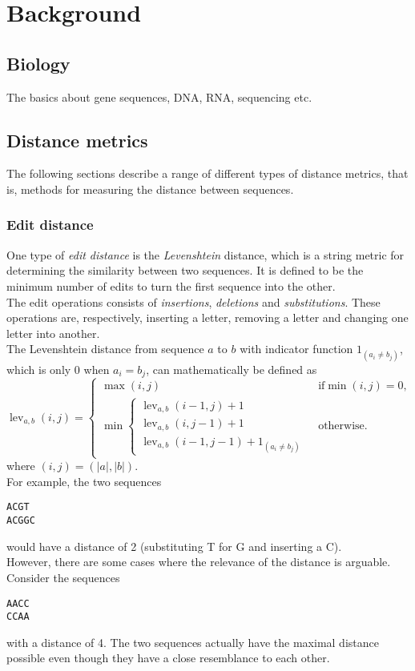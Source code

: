 \section{Background}

\subsection{Biology}
The basics about gene sequences, DNA, RNA, sequencing etc. %

\subsection{Distance metrics}
The following sections describe a range of different types of distance metrics,
that is, methods for measuring the distance between sequences.

\subsubsection{Edit distance}
One type of \emph{edit distance} is the \emph{Levenshtein} distance, which is a
string metric for determining the similarity between two sequences. It is
defined to be the minimum number of edits to turn the first sequence into the
other. \\
The edit operations consists of \emph{insertions}, \emph{deletions} and
\emph{substitutions}. These operations are, respectively, inserting a letter,
removing a letter and changing one letter into another. \\
The Levenshtein distance from sequence $a$ to $b$ with indicator function 
$1_{(a_i\neq b_j)}$, which is only $0$ when $a_i=b_j$, can mathematically be 
defined as
\begin{equation}
  \operatorname{lev}_{a,b}(i,j)= 
  \begin{cases}
      \max(i,j) & \text{ if} \min(i,j)=0, \\
        \min \begin{cases}
            \operatorname{lev}_{a,b}(i-1,j) + 1 \\
            \operatorname{lev}_{a,b}(i,j-1) + 1 \\
            \operatorname{lev}_{a,b}(i-1,j-1) + 1_{(a_i \neq b_j)}
       \end{cases} & \text{ otherwise.}
  \end{cases}
\end{equation}
where $(i,j)=(|a|,|b|)$.\\
For example, the two sequences
\begin{center}
\texttt{ACGT} \\
\texttt{ACGGC}
\end{center}
would have a distance of 2 (substituting T for G and inserting a C). \\
However, there are some cases where the relevance of the distance is arguable.
Consider the sequences
\begin{center}
\texttt{AACC} \\
\texttt{CCAA}
\end{center}
with a distance of 4. The two sequences actually have the maximal distance
possible even though they have a close resemblance to each other.


